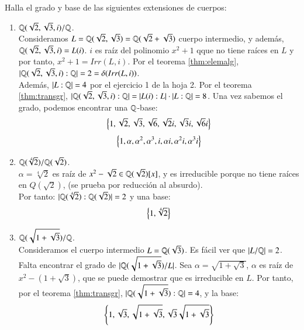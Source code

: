 \begin{ex}[H2.4 (parte)]
    Halla el grado y base de las siguientes extensiones de cuerpos:
    \begin{enumerate}
        \item $\mathbb{Q}(\sqrt{2}, \sqrt{3}, i)/\mathbb{Q}$.\\
        Consideramos $L = \mathbb{Q}(\sqrt{2}, \sqrt{3}) = \mathbb{Q}(\sqrt{2} + \sqrt{3})$ cuerpo intermedio, y además, $\mathbb{Q}(\sqrt{2}, \sqrt{3}, i) = L(i)$. $i$ es raíz del polinomio $x^2 + 1$ qque no tiene raíces en $L$ y por tanto, $x^2 + 1 = Irr(L, i)$. Por el teorema \ref{thm:elemalg}, $|\mathbb{Q}(\sqrt{2}, \sqrt{3}, i):\mathbb{Q}| = 2 = \delta(Irr(L, i))$.\\

        Además, $|L:\mathbb{Q}| = 4$ por el ejercicio 1 de la hoja 2. Por el teorema \ref{thm:transgr}, $|\mathbb{Q}(\sqrt{2}, \sqrt{3}, i) : \mathbb{Q}| = |L(i):L|\cdot|L:\mathbb{Q}| = 8$. Una vez sabemos el grado, podemos encontrar una $\mathbb{Q}$-base:
        $$
            \left\{1, \sqrt{2}, \sqrt{3}, \sqrt{6}, \sqrt{2} i, \sqrt{3} i, \sqrt{6} i\right\}
        $$
        $$
            \left\{1, \alpha, \alpha^2, \alpha^3, i, \alpha i, \alpha^2 i, \alpha^3 i\right\}
        $$

        \item $\mathbb{Q}(\sqrt[4]{2})/\mathbb{Q}(\sqrt{2})$.\\
        $\alpha = \sqrt[4]{2}$ es raíz de $x^2 - \sqrt{2} \in \mathbb{Q}(\sqrt{2})[x]$, y es irreducible porque no tiene raíces en $Q(\sqrt{2})$, (se prueba por reducción al absurdo).\\
        Por tanto: $|\mathbb{Q}(\sqrt[4]{2}):\mathbb{Q}(\sqrt{2})| = 2$ y una base:
        $$
            \left\{1, \sqrt[4]{2}\right\}
        $$

        \item $\mathbb{Q}(\sqrt{1+\sqrt 3})/\mathbb{Q}$.\\
        Consideramos el cuerpo intermedio $L = \mathbb{Q}(\sqrt{3})$. Es fácil ver que $|L/\mathbb{Q}| = 2$. Falta encontrar el grado de $|\mathbb{Q}(\sqrt{1+\sqrt 3})/L|$. Sea $\alpha = \sqrt{1 + \sqrt 3}$, $\alpha$ es raíz de $x^2 - (1+\sqrt 3)$, que se puede demostrar que es irreducible en $L$. Por tanto, por el teorema \ref{thm:transgr}, $|\mathbb{Q}(\sqrt{1+\sqrt 3}):\mathbb{Q}| = 4$, y la base:
        $$
            \left\{1, \sqrt 3, \sqrt{1 + \sqrt 3}, \sqrt 3 \sqrt{1 + \sqrt 3}\right\}
        $$
    \end{enumerate}
\end{ex}

